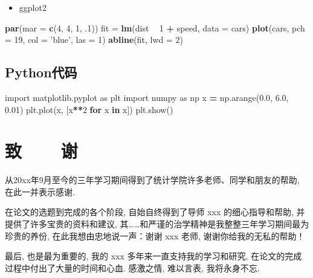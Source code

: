 \documentclass[12pt,a4paper,zihao=-4,UTF8]{book}
\newenvironment{Shaded}{\begin{snugshade}}{\end{snugshade}}
\newcommand{\KeywordTok}[1]{\textcolor[rgb]{0.13,0.29,0.53}{\textbf{#1}}}
\newcommand{\DataTypeTok}[1]{\textcolor[rgb]{0.13,0.29,0.53}{#1}}
\newcommand{\DecValTok}[1]{\textcolor[rgb]{0.00,0.00,0.81}{#1}}
\newcommand{\FloatTok}[1]{\textcolor[rgb]{0.00,0.00,0.81}{#1}}
\newcommand{\StringTok}[1]{\textcolor[rgb]{0.31,0.60,0.02}{#1}}
\newcommand{\ImportTok}[1]{#1}
\newcommand{\ControlFlowTok}[1]{\textcolor[rgb]{0.13,0.29,0.53}{\textbf{#1}}}
\newcommand{\OperatorTok}[1]{\textcolor[rgb]{0.81,0.36,0.00}{\textbf{#1}}}
\newcommand{\NormalTok}[1]{#1}
\providecommand{\tightlist}{%
  \setlength{\itemsep}{0pt}\setlength{\parskip}{0pt}}
\renewcommand{\baselinestretch}{1.5} %
\begin{document}
\begin{itemize}
\tightlist
\item
  ggplot2
\end{itemize}

\begin{Shaded}
\begin{Highlighting}[]
\KeywordTok{par}\NormalTok{(}\DataTypeTok{mar =} \KeywordTok{c}\NormalTok{(}\DecValTok{4}\NormalTok{, }\DecValTok{4}\NormalTok{, }\DecValTok{1}\NormalTok{, .}\DecValTok{1}\NormalTok{))}
\NormalTok{fit =}\StringTok{ }\KeywordTok{lm}\NormalTok{(dist }\OperatorTok{~}\StringTok{ }\DecValTok{1} \OperatorTok{+}\StringTok{ }\NormalTok{speed, }\DataTypeTok{data =}\NormalTok{ cars)}
\KeywordTok{plot}\NormalTok{(cars, }\DataTypeTok{pch =} \DecValTok{19}\NormalTok{, }\DataTypeTok{col =} \StringTok{'blue'}\NormalTok{, }\DataTypeTok{las =} \DecValTok{1}\NormalTok{)}
\KeywordTok{abline}\NormalTok{(fit, }\DataTypeTok{lwd =} \DecValTok{2}\NormalTok{)}
\end{Highlighting}
\end{Shaded}

\section{Python代码}

\begin{Shaded}
\begin{Highlighting}[]
\ImportTok{import}\NormalTok{ matplotlib.pyplot }\ImportTok{as}\NormalTok{ plt}
\ImportTok{import}\NormalTok{ numpy }\ImportTok{as}\NormalTok{ np}
\NormalTok{x }\OperatorTok{=}\NormalTok{ np.arange(}\FloatTok{0.0}\NormalTok{, }\FloatTok{6.0}\NormalTok{, }\FloatTok{0.01}\NormalTok{)}
\NormalTok{plt.plot(x, [x}\OperatorTok{**}\DecValTok{2} \ControlFlowTok{for}\NormalTok{ x }\KeywordTok{in}\NormalTok{ x])}
\NormalTok{plt.show()}
\end{Highlighting}
\end{Shaded}

\backmatter 

\renewcommand{\baselinestretch}{1.8}

\chapter*{致~~~~谢}

从20xx年9月至今的三年学习期间得到了统计学院许多老师、同学和朋友的帮助,
在此一并表示感谢.

在论文的选题到完成的各个阶段, 自始自终得到了导师 xxx 的细心指导和帮助,
并提供了许多宝贵的资料和建议,
其\ldots{}\ldots{}和严谨的治学精神是我整整三年学习期间最为珍贵的养份,
在此我想由忠地说一声：谢谢 xxx 老师, 谢谢你给我的无私的帮助！

最后, 也是最为重要的, 我的 xxx 多年来一直支持我的学习和研究,
在论文的完成过程中付出了大量的时间和心血. 感激之情, 难以言表,
我将永身不忘.

\clearpage
\end{document}
